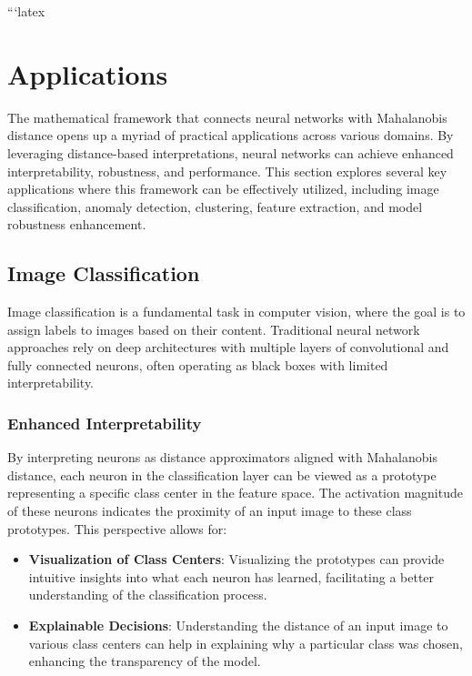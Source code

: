 ```latex

\section{Applications}
\label{sec:applications}

The mathematical framework that connects neural networks with Mahalanobis distance opens up a myriad of practical applications across various domains. By leveraging distance-based interpretations, neural networks can achieve enhanced interpretability, robustness, and performance. This section explores several key applications where this framework can be effectively utilized, including image classification, anomaly detection, clustering, feature extraction, and model robustness enhancement.

\subsection{Image Classification}
\label{subsec:image_classification}

Image classification is a fundamental task in computer vision, where the goal is to assign labels to images based on their content. Traditional neural network approaches rely on deep architectures with multiple layers of convolutional and fully connected neurons, often operating as black boxes with limited interpretability.

\subsubsection{Enhanced Interpretability}
By interpreting neurons as distance approximators aligned with Mahalanobis distance, each neuron in the classification layer can be viewed as a prototype representing a specific class center in the feature space. The activation magnitude of these neurons indicates the proximity of an input image to these class prototypes. This perspective allows for:
\begin{itemize}
    \item \textbf{Visualization of Class Centers}: Visualizing the prototypes can provide intuitive insights into what each neuron has learned, facilitating a better understanding of the classification process.
    \item \textbf{Explainable Decisions}: Understanding the distance of an input image to various class centers can help in explaining why a particular class was chosen, enhancing the transparency of the model.
\end{itemize}

